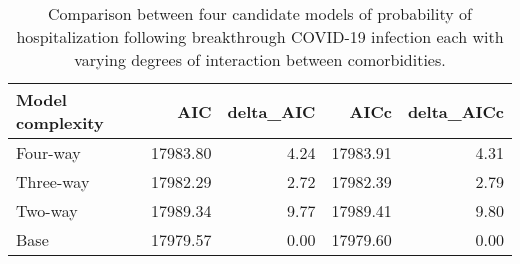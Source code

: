 \begin{table}[ht]
\centering
\begin{tabular}{lrrrr}
  \hline
Model complexity & AIC & delta\_AIC & AICc & delta\_AICc \\ 
  \hline
Four-way & 17983.80 & 4.24 & 17983.91 & 4.31 \\ 
  Three-way & 17982.29 & 2.72 & 17982.39 & 2.79 \\ 
  Two-way & 17989.34 & 9.77 & 17989.41 & 9.80 \\ 
  Base & 17979.57 & 0.00 & 17979.60 & 0.00 \\ 
   \hline
\end{tabular}
\caption{Comparison between four candidate models of probability of hospitalization following breakthrough COVID-19 infection each with varying degrees of interaction between comorbidities.} 
\end{table}
